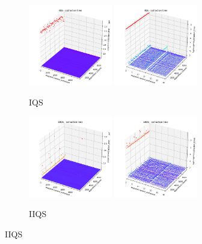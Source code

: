 \begin{figure}
    \centering
    \begin{subfigure}[b]{\textwidth}
        \centering
        \includegraphics[width=0.40\textwidth]{./fragments/05_workhorse_experiment/images/01_basebenchmark_05_classes.png.1_0.png}
        \includegraphics[width=0.40\textwidth]{./fragments/05_workhorse_experiment/images/01_basebenchmark_05_classes.png.1_1.png}
        \caption{IQS}
        \label{FIG:WORKHORSE_BENCHMARK_05__0_0}
    \end{subfigure}

    \begin{subfigure}[b]{\textwidth}
        \centering
        \includegraphics[width=0.40\textwidth]{./fragments/05_workhorse_experiment/images/01_basebenchmark_05_classes.png.0_1.png}
        \includegraphics[width=0.40\textwidth]{./fragments/05_workhorse_experiment/images/01_basebenchmark_05_classes.png.0_2.png}
        \caption{IIQS}
        \label{FIG:WORKHORSE_BENCHMARK_05__0_1}
    \end{subfigure}


\end{figure}
